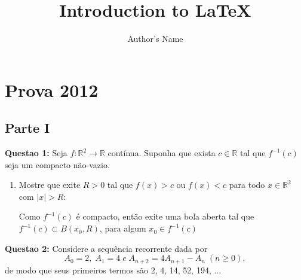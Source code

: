 \documentclass{article}
\begin{document}
\title{Introduction to \LaTeX{}}
\author{Author's Name}

\maketitle


\section{Prova 2012}

\subsection{Parte I}
\textbf{Questao 1:} Seja $f: \mathbb R^2 \to \mathbb R$ contínua. Suponha que
exista $c \in \mathbb R$ tal que $f^{-1}(c)$ seja um compacto não-vazio.

\begin{enumerate}[label=(\alph*)]
  \item Mostre que exite $R > 0$ tal que $f(x)>c$ ou $f(x)<c$ para todo $x \in
  \mathbb R^2$ com $|x|>R$:
  
  Como $f^{-1}(c)$ é compacto, então exite uma bola
  aberta tal que $f^{-1}(c) \subset B(x_0, R)$, para algum $x_0 \in f^{-1}(c) $
\end{enumerate}


\textbf{Questao 2:} Considere a sequência recorrente dada por
$$
A_0 = 2, \; A_1 = 4 \; e \; A_{n+2} = 4A_{n+1} - A_n \;(n\geq 0),
$$
de modo que seus primeiros termos são 2, 4, 14, 52, 194, ...
\end{document}
